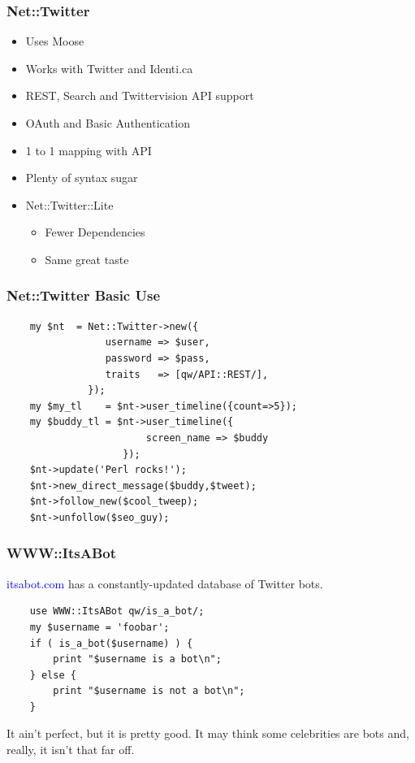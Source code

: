 \documentclass[12pt]{beamer}
\begin{document}
\begin{frame}[fragile]
    \frametitle{Net::Twitter}
    \begin{itemize}
    \item Uses Moose
    \item Works with Twitter and Identi.ca
    \item REST, Search and Twittervision API support
    \item OAuth and Basic Authentication
    \item 1 to 1 mapping with API
    \item Plenty of syntax sugar
    \item Net::Twitter::Lite
        \begin{itemize}
        \item Fewer Dependencies
        \item Same great taste
        \end{itemize}
    \end{itemize}
\end{frame}

\begin{frame}[fragile]
    \frametitle{Net::Twitter Basic Use}
    \begin{small}
    \begin{verbatim}
    my $nt  = Net::Twitter->new({
                 username => $user,
                 password => $pass,
                 traits   => [qw/API::REST/],
              });
    my $my_tl    = $nt->user_timeline({count=>5});
    my $buddy_tl = $nt->user_timeline({
                        screen_name => $buddy
                    });
    $nt->update('Perl rocks!');
    $nt->new_direct_message($buddy,$tweet);
    $nt->follow_new($cool_tweep);
    $nt->unfollow($seo_guy);

    \end{verbatim}
    \end{small}
\end{frame}

\begin{frame}[fragile]
    \frametitle{WWW::ItsABot}
    \textcolor{blue}{itsabot.com} has a constantly-updated database of Twitter bots.
    \begin{verbatim}
    use WWW::ItsABot qw/is_a_bot/;
    my $username = 'foobar';
    if ( is_a_bot($username) ) {
        print "$username is a bot\n";
    } else {
        print "$username is not a bot\n";
    }
    \end{verbatim}

    It ain't perfect, but it is pretty good. It may
    think some celebrities are bots and, really,
    it isn't that far off.

\end{frame}
\end{document}
